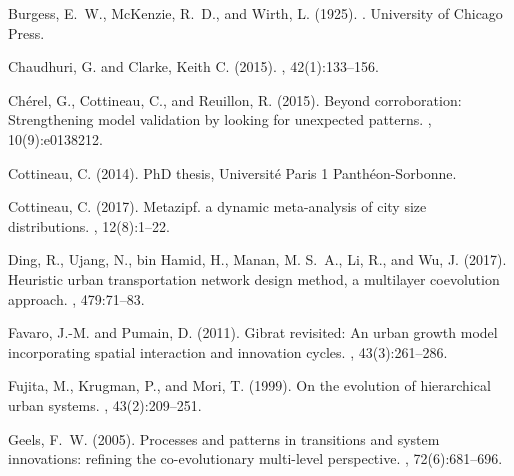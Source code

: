 \documentclass[11pt]{article}
\begin{document}
\begin{thebibliography}{}
Burgess, E.~W., McKenzie, R.~D., and Wirth, L. (1925).
.
\newblock University of Chicago Press.

{Chaudhuri, G. and Clarke, Keith C.} ({2015}).
,
  42(1):133--156.

Ch{\'e}rel, G., Cottineau, C., and Reuillon, R. (2015).
\newblock Beyond corroboration: Strengthening model validation by looking for
  unexpected patterns.
, 10(9):e0138212.

Cottineau, C. (2014).
\newblock PhD thesis, Universit{\'e} Paris 1 Panth{\'e}on-Sorbonne.

Cottineau, C. (2017).
\newblock Metazipf. a dynamic meta-analysis of city size distributions.
, 12(8):1--22.

Ding, R., Ujang, N., bin Hamid, H., Manan, M. S.~A., Li, R., and Wu, J. (2017).
\newblock Heuristic urban transportation network design method, a multilayer
  coevolution approach.
,
  479:71--83.

Favaro, J.-M. and Pumain, D. (2011).
\newblock Gibrat revisited: An urban growth model incorporating spatial
  interaction and innovation cycles.
, 43(3):261--286.

Fujita, M., Krugman, P., and Mori, T. (1999).
\newblock On the evolution of hierarchical urban systems.
, 43(2):209--251.

Geels, F.~W. (2005).
\newblock Processes and patterns in transitions and system innovations:
  refining the co-evolutionary multi-level perspective.
, 72(6):681--696.


\end{thebibliography}
\end{document}
